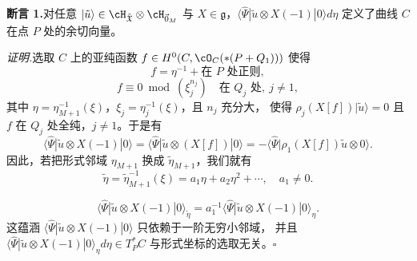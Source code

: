 \noindent\textbf{断言 1.}\quad 对任意
$|\tilde{u}\rangle\in\cH_{\tilde{\mathfrak{X}}}\otimes\cH_{\vec{0}_M}$ 与
$X\in\mathfrak{g}$，$\langle\hat{\Psi}|\tilde{u}\otimes X(-1)|0\rangle d\eta$
定义了曲线 $C$ 在点 $P$ 处的余切向量。

\noindent\textit{证明.}\quad 选取 $C$ 上的亚纯函数
$f\in H^0(C,\cO_C(*(P+Q_1)))$ 使得
\[
  f = \eta^{-1} + \text{在 } P \text{ 处正则},
\]
\[
  f\equiv 0 \bmod(\xi_j^{n_j}) \quad \text{在 } Q_j \text{ 处},\ j\ne 1,
\]
其中 $\eta=\eta_{M+1}^{-1}(\xi)$，$\xi_j=\eta_j^{-1}(\xi)$，且 $n_j$ 充分大，
使得 $\rho_j(X[f])|\tilde{u}\rangle=0$ 且 $f$ 在 $Q_j$ 处全纯，$j\ne 1$。于是有
\[
  \langle\hat{\Psi}|\tilde{u}\otimes X(-1)|0\rangle
  = \langle\hat{\Psi}|\tilde{u}\otimes(X[f])|0\rangle
  = -\langle\hat{\Psi}|\rho_1(X[f])\tilde{u}\otimes 0\rangle .
\]
因此，若把形式邻域 $\eta_{M+1}$ 换成 $\tilde{\eta}_{M+1}$，我们就有
\[
  \tilde{\eta} = \tilde{\eta}_{M+1}^{-1}(\xi)
  = a_1\eta + a_2\eta^2 + \cdots,\quad a_1\ne 0 .
\]

\[
  \langle\hat{\Psi}|\tilde{u}\otimes X(-1)|0\rangle_{\tilde{\eta}}
  = a_1^{-1}\langle\hat{\Psi}|\tilde{u}\otimes X(-1)|0\rangle_{\eta} .
\]
这蕴涵 $\langle\hat{\Psi}|\tilde{u}\otimes X(-1)|0\rangle$ 只依赖于一阶无穷小邻域，
并且 $\langle\hat{\Psi}|\tilde{u}\otimes X(-1)|0\rangle_\eta d\eta\in T_P^*C$
与形式坐标的选取无关。\hfill$\square$

